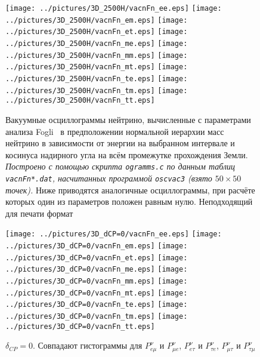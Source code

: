\begin{figure}[!ht]
\texttt{[image: ../pictures/3D\_2500H/vacnFn\_ee.eps]}\hspace*{-2mm}
\texttt{[image: ../pictures/3D\_2500H/vacnFn\_em.eps]}\hspace*{-2mm}
\texttt{[image: ../pictures/3D\_2500H/vacnFn\_et.eps]}\hspace*{-2mm}
\texttt{[image: ../pictures/3D\_2500H/vacnFn\_me.eps]}\hspace*{-2mm}
\texttt{[image: ../pictures/3D\_2500H/vacnFn\_mm.eps]}\hspace*{-2mm}
\texttt{[image: ../pictures/3D\_2500H/vacnFn\_mt.eps]}\hspace*{-2mm}
\texttt{[image: ../pictures/3D\_2500H/vacnFn\_te.eps]}\hspace*{-2mm}
\texttt{[image: ../pictures/3D\_2500H/vacnFn\_tm.eps]}\hspace*{-2mm}
\texttt{[image: ../pictures/3D\_2500H/vacnFn\_tt.eps]}
\caption{Вакуумные осциллограммы нейтрино, вычисленные с параметрами анализа Fogli~\cite{Fogli:2012ua} в предположении нормальной иерархии масс нейтрино в зависимости от энергии на выбранном интервале и косинуса надирного угла на всём промежутке прохождения Земли. \textit{Построено с помощью скрипта \texttt{ogramms.c} по данным таблиц \texttt{vacnFn*.dat}, насчитанных программой \texttt{oscvac3} (взято $50\times50$ точек).} Ниже приводятся аналогичные осциллограммы, при расчёте которых один из параметров положен равным нулю. {\color{magenta}Неподходящий для печати формат}}
\label{vacn3DFn_ex}
\end{figure}
\begin{figure}[!ht]
\vspace*{-0.75cm}
\texttt{[image: ../pictures/3D\_dCP=0/vacnFn\_ee.eps]}\hspace*{-2mm}
\texttt{[image: ../pictures/3D\_dCP=0/vacnFn\_em.eps]}\hspace*{-2mm}
\texttt{[image: ../pictures/3D\_dCP=0/vacnFn\_et.eps]}\hspace*{-2mm}
\texttt{[image: ../pictures/3D\_dCP=0/vacnFn\_me.eps]}\hspace*{-2mm}
\texttt{[image: ../pictures/3D\_dCP=0/vacnFn\_mm.eps]}\hspace*{-2mm}
\texttt{[image: ../pictures/3D\_dCP=0/vacnFn\_mt.eps]}\hspace*{-2mm}
\texttt{[image: ../pictures/3D\_dCP=0/vacnFn\_te.eps]}\hspace*{-2mm}
\texttt{[image: ../pictures/3D\_dCP=0/vacnFn\_tm.eps]}\hspace*{-2mm}
\texttt{[image: ../pictures/3D\_dCP=0/vacnFn\_tt.eps]}
\caption{$\delta_{CP}=0$. Совпадают гистограммы для $P^{\nu}_{e\mu}$ и $P^{\nu}_{\mu{}e}$, $P^{\nu}_{e\tau}$ и $P^{\nu}_{\tau{}e}$, $P^{\nu}_{\mu\tau}$ и $P^{\nu}_{\tau\mu}$}
\label{vacn3DFn_dCP=0}
\end{figure}
